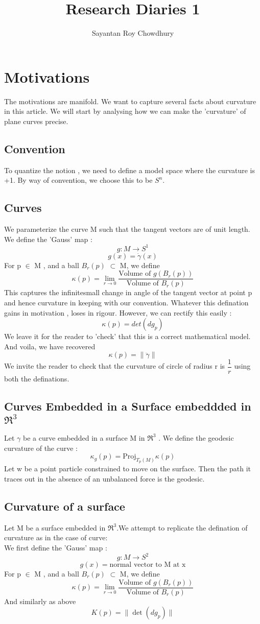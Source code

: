 \documentclass[psamsfonts]{amsart}
\title{Research Diaries 1}
\author{Sayantan Roy Chowdhury}
\theoremstyle{definition}
\theoremstyle{remark}
\numberwithin{equation}{section}
\begin{document}
\maketitle
\tableofcontents
\section{Motivations}
The motivations are manifold. We want  to capture several facts about curvature in this article. We will start by analysing how  we can make the 'curvature' of plane curves precise.
\subsection{Convention}
To quantize the notion , we need to define a model space where the curvature is +1. By way of convention, we choose this to be $S^{n}$.
\subsection{Curves} 
We parameterize the curve M such that the tangent vectors are of unit length. We define the 'Gauss' map : 
\[   g : M \to S^{1} \]
\[   g(x) = \dot{\gamma}(x) \]
For p $\in$ M , and a ball $B_{r}(p)$ $\subset$ M, we define
\[ \kappa(p) =  \lim_{r \to 0} \dfrac{\text{Volume of } g(B_{r}(p))}{\text{Volume of }B_{r}(p)}  \] 
This captures the infinitesmall change in angle of the tangent vector at point p and hence curvature in keeping with our convention. Whatever
this defination gains in motivation , loses in rigour. However, we can rectify this easily :
\[ \kappa(p) = det(dg_{p}) \]
We leave it for the reader to 'check' that this is a correct mathematical model. And voila, we have recovered
\[\kappa(p) = \| \ddot{\gamma} \| \] 
We invite the reader to check that the curvature of circle of radius r is $\dfrac{1}{r}$ using both the definations.





\subsection{Curves Embedded in a Surface embeddded in $\Re^{3}$ } 
Let $\gamma$ be a curve embedded in a surface M in $\Re^{3}$ . 
We define the geodesic curvature of the curve :
\[ \kappa_{g}(p) = \text{Proj}_{T_{p}(M)}\kappa(p)\]  
Let w be a point particle constrained to move on the surface. Then the path it traces out in the absence of an unbalanced force is the geodesic.
\subsection{Curvature of a surface}
Let M be a  surface embedded in $\Re^{3}$.We attempt to replicate the defination of curvature as in the case of curve:\\
We first define the 'Gauss' map : 
\[   g : M \to S^{2} \]
\[   g(x) = \text{normal vector to M at x}  \]
For p $\in$ M , and a ball $B_{r}(p)$ $\subset$ M, we define
\[ \kappa(p) =  \lim_{r \to 0} \dfrac{\text{Volume of } g(B_{r}(p))}{\text{Volume of }B_{r}(p)}  \] 
And similarly as above 
\[K(p) = \| \det(dg_{p}) \| \]
\end{document}
